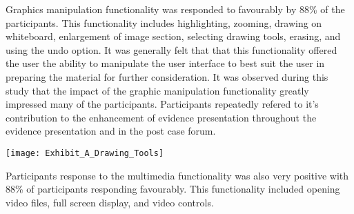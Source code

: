 





Graphics manipulation functionality was responded to favourably by 88\% of the participants. This functionality includes highlighting, zooming, drawing on whiteboard, enlargement of image section, selecting drawing tools, erasing, and using the undo option. It was generally felt that that this functionality offered the user the ability to manipulate the user interface to best suit the user in preparing the material for further consideration.
It was observed during this study that the impact of the graphic manipulation functionality greatly impressed many of the participants. Participants repeatedly refered to it's contribution to the enhancement of evidence presentation throughout the evidence presentation and in the post case forum.

\texttt{[image: Exhibit\_A\_Drawing\_Tools]}

Participants response to the multimedia functionality was also very positive with 88\% of participants responding favourably. This functionality included opening video files, full screen display, and video controls.  


